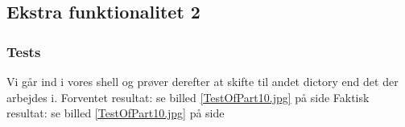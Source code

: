 \subsection{Ekstra funktionalitet 2}
\subsubsection{Tests}
Vi går ind i vores shell og prøver derefter at skifte til andet dictory end det der arbejdes i.
Forventet resultat: se billed \ref{TestOfPart10.jpg} på side \pageref{Test10}
Faktisk resultat: se billed \ref{TestOfPart10.jpg} på side \pageref{Test10}